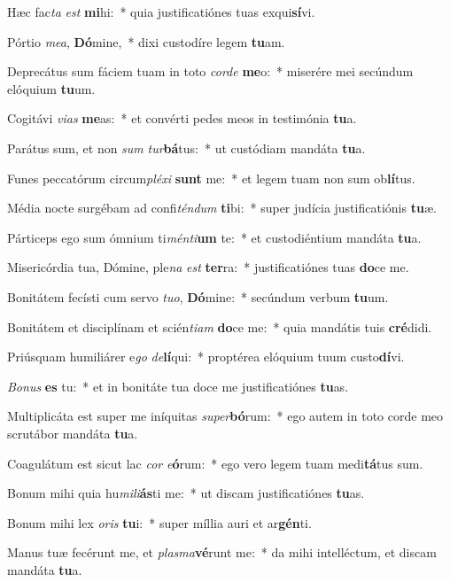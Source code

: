 \item Hæc fac\textit{ta} \textit{est} \textbf{mi}hi:~* quia justificatiónes tuas exqui\textbf{sí}vi.
\item Pórtio \textit{me}\textit{a}, \textbf{Dó}mine,~* dixi custodíre legem \textbf{tu}am.
\item Deprecátus sum fáciem tuam in toto \textit{cor}\textit{de} \textbf{me}o:~* miserére mei secúndum elóquium \textbf{tu}um.
\item Cogitávi \textit{vi}\textit{as} \textbf{me}as:~* et convérti pedes meos in testimónia \textbf{tu}a.
\item Parátus sum, et non \textit{sum} \textit{tur}\textbf{bá}tus:~* ut custódiam mandáta \textbf{tu}a.
\item Funes peccatórum circum\textit{plé}\textit{xi} \textbf{sunt} me:~* et legem tuam non sum ob\textbf{lí}tus.
\item Média nocte surgébam ad confi\textit{tén}\textit{dum} \textbf{ti}bi:~* super judícia justificatiónis \textbf{tu}æ.
\item Párticeps ego sum ómnium ti\textit{mén}\textit{ti}\textbf{um} te:~* et custodiéntium mandáta \textbf{tu}a.
\item Misericórdia tua, Dómine, ple\textit{na} \textit{est} \textbf{ter}ra:~* justificatiónes tuas \textbf{do}ce me.
\item Bonitátem fecísti cum servo \textit{tu}\textit{o}, \textbf{Dó}mine:~* secúndum verbum \textbf{tu}um.
\item Bonitátem et disciplínam et scién\textit{ti}\textit{am} \textbf{do}ce me:~* quia mandátis tuis \textbf{cré}didi.
\item Priúsquam humiliárer e\textit{go} \textit{de}\textbf{lí}qui:~* proptérea elóquium tuum custo\textbf{dí}vi.
\item \textit{Bo}\textit{nus} \textbf{es} tu:~* et in bonitáte tua doce me justificatiónes \textbf{tu}as.
\item Multiplicáta est super me iníquitas \textit{su}\textit{per}\textbf{bó}rum:~* ego autem in toto corde meo scrutábor mandáta \textbf{tu}a.
\item Coagulátum est sicut lac \textit{cor} \textit{e}\textbf{ó}rum:~* ego vero legem tuam medi\textbf{tá}tus sum.
\item Bonum mihi quia hu\textit{mi}\textit{li}\textbf{ás}ti me:~* ut discam justificatiónes \textbf{tu}as.
\item Bonum mihi lex \textit{o}\textit{ris} \textbf{tu}i:~* super míllia auri et ar\textbf{gén}ti.
\item Manus tuæ fecérunt me, et \textit{plas}\textit{ma}\textbf{vé}runt me:~* da mihi intelléctum, et discam mandáta \textbf{tu}a.
